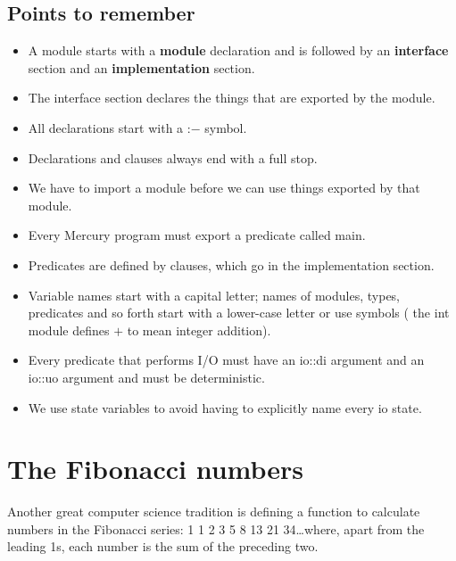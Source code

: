 \documentclass[a4paper,11pt,notitlepage,onecolumn]{book}
\begin{document}
\subsection*{Points to remember}

\begin{itemize}
\item A module starts with a \textsf{\textbf{module}} declaration and is followed by an
\textsf{\textbf{interface}} section and an \textsf{\textbf{implementation}} section.
\item The interface section declares the things that are exported by the
module.
\item All declarations start with a \textsf{:{\ensuremath{-}}} symbol.
\item Declarations and clauses always end with a full stop.
\item We have to import a module before we can use things exported by that
module.
\item Every Mercury program must export a predicate called \textsf{main}.
\item Predicates are defined by clauses, which go in the implementation
section.
\item Variable names start with a capital letter; names of modules, types,
predicates and so forth start with a lower-case letter or use symbols (\eg
the \textsf{int} module defines \textsf{{\ensuremath{+}}} to mean integer addition).
\item Every predicate that performs I/O must have an \textsf{io::di} argument and an
\textsf{io::uo} argument and must be deterministic.
\item We use state variables to avoid having to explicitly name every \textsf{io}
state.
\end{itemize}





\newpage





\section{The Fibonacci numbers}

Another great computer science tradition is defining a
function to calculate numbers in the Fibonacci series:
1 1 2 3 5 8 13 21 34\ldots where, apart from the leading 1s, each number is
the sum of the preceding two.
\end{document}
